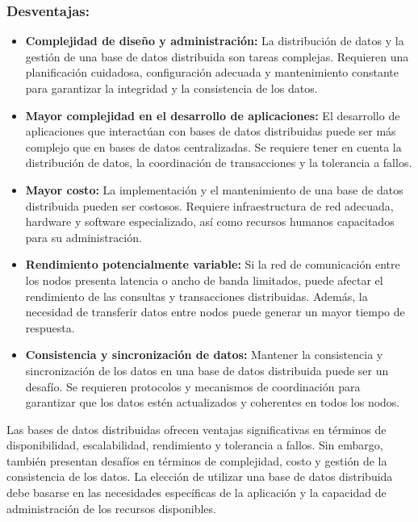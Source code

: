 \subsubsection{Desventajas:}
\noindent
\begin{itemize}
	\item \textbf{Complejidad de diseño y administración:} La distribución de datos y la gestión de una base de datos distribuida son tareas complejas. Requieren una planificación cuidadosa, configuración adecuada y mantenimiento constante para garantizar la integridad y la consistencia de los datos.
	\item \textbf{Mayor complejidad en el desarrollo de aplicaciones:} El desarrollo de aplicaciones que interactúan con bases de datos distribuidas puede ser más complejo que en bases de datos centralizadas. Se requiere tener en cuenta la distribución de datos, la coordinación de transacciones y la tolerancia a fallos.
	\item \textbf{Mayor costo:} La implementación y el mantenimiento de una base de datos distribuida pueden ser costosos. Requiere infraestructura de red adecuada, hardware y software especializado, así como recursos humanos capacitados para su administración.
	\item \textbf{Rendimiento potencialmente variable:} Si la red de comunicación entre los nodos presenta latencia o ancho de banda limitados, puede afectar el rendimiento de las consultas y transacciones distribuidas. Además, la necesidad de transferir datos entre nodos puede generar un mayor tiempo de respuesta.
	\item \textbf{Consistencia y sincronización de datos:} Mantener la consistencia y sincronización de los datos en una base de datos distribuida puede ser un desafío. Se requieren protocolos y mecanismos de coordinación para garantizar que los datos estén actualizados y coherentes en todos los nodos.
\end{itemize}

\begin{tcolorbox}[colback=yellow!10!white, colframe=blue!50!black, title=Concluyendo, coltitle=white]
	Las bases de datos distribuidas ofrecen ventajas significativas en términos de disponibilidad, escalabilidad, rendimiento y tolerancia a fallos. Sin embargo, también presentan desafíos en términos de complejidad, costo y gestión de la consistencia de los datos. La elección de utilizar una base de datos distribuida debe basarse en las necesidades específicas de la aplicación y la capacidad de administración de los recursos disponibles.
\end{tcolorbox}
